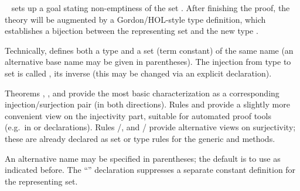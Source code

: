 \begin{isabellebody}
\begin{isamarkuptext}
\begin{description}
  \item \hyperlink{command.HOL.typedef}{\mbox{}}~ sets up
  a goal stating non-emptiness of the set .  After finishing
  the proof, the theory will be augmented by a Gordon/HOL-style type
  definition, which establishes a bijection between the representing
  set  and the new type .
  
  Technically, \hyperlink{command.HOL.typedef}{\mbox{}} defines both a type  and a set (term constant) of the same name (an alternative base
  name may be given in parentheses).  The injection from type to set
  is called , its inverse  (this may be
  changed via an explicit \hyperlink{keyword.HOL.morphisms}{\mbox{}} declaration).
  
  Theorems , , and  provide the most basic characterization as a
  corresponding injection/surjection pair (in both directions).  Rules
   and  provide a slightly
  more convenient view on the injectivity part, suitable for automated
  proof tools (e.g.\ in \hyperlink{attribute.simp}{\mbox{}} or \hyperlink{attribute.iff}{\mbox{}}
  declarations).  Rules /, and
  / provide alternative views
  on surjectivity; these are already declared as set or type rules for
  the generic \hyperlink{method.cases}{\mbox{}} and \hyperlink{method.induct}{\mbox{}} methods.
  
  An alternative name may be specified in parentheses; the default is
  to use  as indicated before.  The ``''
  declaration suppresses a separate constant definition for the
  representing set.

  \end{description}


\end{isamarkuptext}
\end{isabellebody}
